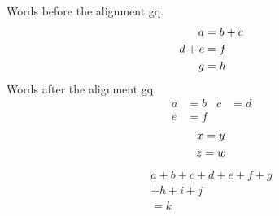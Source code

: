\documentclass{article}
\begin{document}
Words before the alignment gq.
\begin{align}
a &= b + c \label{x}\\
d + e &= f \notag\\
g &= h
\end{align}
Words after the alignment gq.
\begin{align*}
a &= b & c &= d\\
e &= f
\end{align*}
\begin{gather}
x = y\\
z = w \notag
\end{gather}
\begin{multline}
a + b + c + d + e + f + g\\
+ h + i + j\\
= k
\end{multline}
\end{document}
